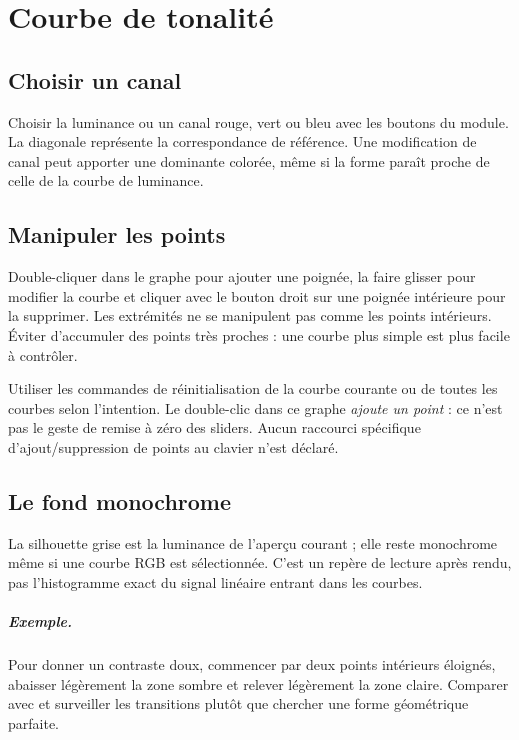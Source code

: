 \chapter{Courbe de tonalité}
\section{Choisir un canal}
Choisir la luminance ou un canal rouge, vert ou bleu avec les boutons du module.
La diagonale représente la correspondance de référence. Une modification de
canal peut apporter une dominante colorée, même si la forme paraît proche
de celle de la courbe de luminance.

\section{Manipuler les points}
Double-cliquer dans le graphe pour ajouter une poignée, la faire glisser
pour modifier la courbe et cliquer avec le bouton droit sur une poignée
intérieure pour la supprimer. Les extrémités ne se manipulent pas comme les
points intérieurs. Éviter d’accumuler des points très proches : une courbe
plus simple est plus facile à contrôler.

Utiliser les commandes de réinitialisation de la courbe courante ou de
toutes les courbes selon l’intention. Le double-clic dans ce graphe
\emph{ajoute un point} : ce n’est pas le geste de remise à zéro des sliders.
Aucun raccourci spécifique d’ajout/suppression de points au clavier n’est déclaré.

\section{Le fond monochrome}
La silhouette grise est la luminance de l’aperçu courant ; elle reste monochrome
même si une courbe RGB est sélectionnée. C’est un repère de lecture après rendu,
pas l’histogramme exact du signal linéaire entrant dans les courbes.

\paragraph{Exemple.}
Pour donner un contraste doux, commencer par deux points intérieurs éloignés,
abaisser légèrement la zone sombre et relever légèrement la zone claire.
Comparer avec  et surveiller les transitions plutôt
que chercher une forme géométrique parfaite.
